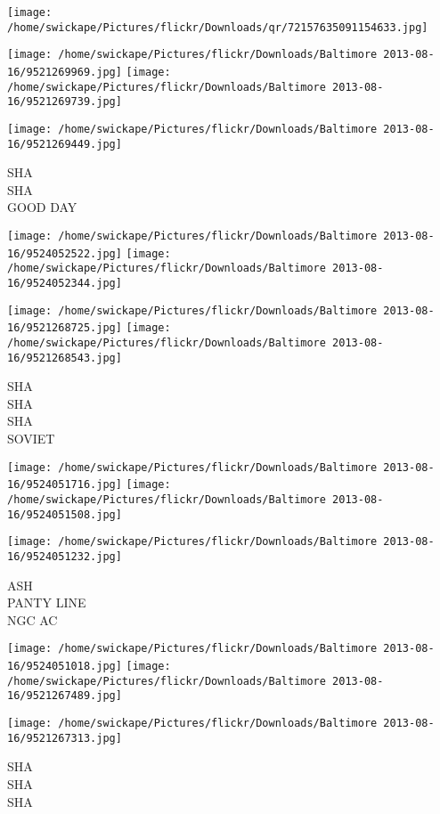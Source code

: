 \documentclass[10pt,letterpaper]{article}
\begin{document}
\texttt{[image: /home/swickape/Pictures/flickr/Downloads/qr/72157635091154633.jpg]}
\pagebreak

\texttt{[image: /home/swickape/Pictures/flickr/Downloads/Baltimore 2013-08-16/9521269969.jpg]}
\texttt{[image: /home/swickape/Pictures/flickr/Downloads/Baltimore 2013-08-16/9521269739.jpg]}

\vspace{0.25in}
\texttt{[image: /home/swickape/Pictures/flickr/Downloads/Baltimore 2013-08-16/9521269449.jpg]}

SHA\\
SHA\\
GOOD DAY
\pagebreak

\texttt{[image: /home/swickape/Pictures/flickr/Downloads/Baltimore 2013-08-16/9524052522.jpg]}
\texttt{[image: /home/swickape/Pictures/flickr/Downloads/Baltimore 2013-08-16/9524052344.jpg]}

\texttt{[image: /home/swickape/Pictures/flickr/Downloads/Baltimore 2013-08-16/9521268725.jpg]}
\texttt{[image: /home/swickape/Pictures/flickr/Downloads/Baltimore 2013-08-16/9521268543.jpg]}

SHA\\
SHA\\
SHA\\
SOVIET
\pagebreak

\texttt{[image: /home/swickape/Pictures/flickr/Downloads/Baltimore 2013-08-16/9524051716.jpg]}
\texttt{[image: /home/swickape/Pictures/flickr/Downloads/Baltimore 2013-08-16/9524051508.jpg]}

\vspace{0.25in}
\texttt{[image: /home/swickape/Pictures/flickr/Downloads/Baltimore 2013-08-16/9524051232.jpg]}

ASH\\
PANTY LINE\\
NGC AC
\pagebreak

\texttt{[image: /home/swickape/Pictures/flickr/Downloads/Baltimore 2013-08-16/9524051018.jpg]}
\texttt{[image: /home/swickape/Pictures/flickr/Downloads/Baltimore 2013-08-16/9521267489.jpg]}

\texttt{[image: /home/swickape/Pictures/flickr/Downloads/Baltimore 2013-08-16/9521267313.jpg]}

SHA\\
SHA\\
SHA
\pagebreak
\end{document}
